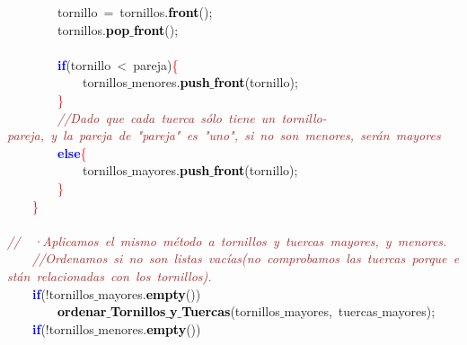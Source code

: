 \mbox{}\ \ \ \ \ \ \ \ tornillo\ \textcolor{BrickRed}{=}\ tornillos\textcolor{BrickRed}{.}\textbf{\textcolor{Black}{front}}\textcolor{BrickRed}{();} \\
\mbox{}\ \ \ \ \ \ \ \ tornillos\textcolor{BrickRed}{.}\textbf{\textcolor{Black}{pop$\_$front}}\textcolor{BrickRed}{();} \\
\mbox{} \\
\mbox{}\ \ \ \ \ \ \ \ \textbf{\textcolor{Blue}{if}}\textcolor{BrickRed}{(}tornillo\ \textcolor{BrickRed}{\textless{}}\ pareja\textcolor{BrickRed}{)}\textcolor{Red}{\{} \\
\mbox{}\ \ \ \ \ \ \ \ \ \ \ \ tornillos$\_$menores\textcolor{BrickRed}{.}\textbf{\textcolor{Black}{push$\_$front}}\textcolor{BrickRed}{(}tornillo\textcolor{BrickRed}{);} \\
\mbox{}\ \ \ \ \ \ \ \ \textcolor{Red}{\}} \\
\mbox{}\ \ \ \ \ \ \ \ \textit{\textcolor{Brown}{//Dado\ que\ cada\ tuerca\ sólo\ tiene\ un\ tornillo-pareja,\ y\ la\ pareja\ de\ "{}pareja"{}\ es\ "{}uno"{},\ si\ no\ son\ menores,\ serán\ mayores}} \\
\mbox{}\ \ \ \ \ \ \ \ \textbf{\textcolor{Blue}{else}}\textcolor{Red}{\{} \\
\mbox{}\ \ \ \ \ \ \ \ \ \ \ \ tornillos$\_$mayores\textcolor{BrickRed}{.}\textbf{\textcolor{Black}{push$\_$front}}\textcolor{BrickRed}{(}tornillo\textcolor{BrickRed}{);} \\
\mbox{}\ \ \ \ \ \ \ \ \textcolor{Red}{\}} \\
\mbox{}\ \ \ \ \textcolor{Red}{\}} \\
\mbox{} \\
\mbox{}\textit{\textcolor{Brown}{//\ \ ·Aplicamos\ el\ mismo\ método\ a\ tornillos\ y\ tuercas\ mayores,\ y\ menores.}} \\
\mbox{}\ \ \ \ \textit{\textcolor{Brown}{//Ordenamos\ si\ no\ son\ listas\ vacías(no\ comprobamos\ las\ tuercas\ porque\ están\ relacionadas\ con\ los\ tornillos).}} \\
\mbox{}\ \ \ \ \textbf{\textcolor{Blue}{if}}\textcolor{BrickRed}{(!}tornillos$\_$mayores\textcolor{BrickRed}{.}\textbf{\textcolor{Black}{empty}}\textcolor{BrickRed}{())} \\
\mbox{}\ \ \ \ \ \ \ \ \textbf{\textcolor{Black}{ordenar$\_$Tornillos$\_$y$\_$Tuercas}}\textcolor{BrickRed}{(}tornillos$\_$mayores\textcolor{BrickRed}{,}\ tuercas$\_$mayores\textcolor{BrickRed}{);} \\
\mbox{}\ \ \ \ \textbf{\textcolor{Blue}{if}}\textcolor{BrickRed}{(!}tornillos$\_$menores\textcolor{BrickRed}{.}\textbf{\textcolor{Black}{empty}}\textcolor{BrickRed}{())} \\
